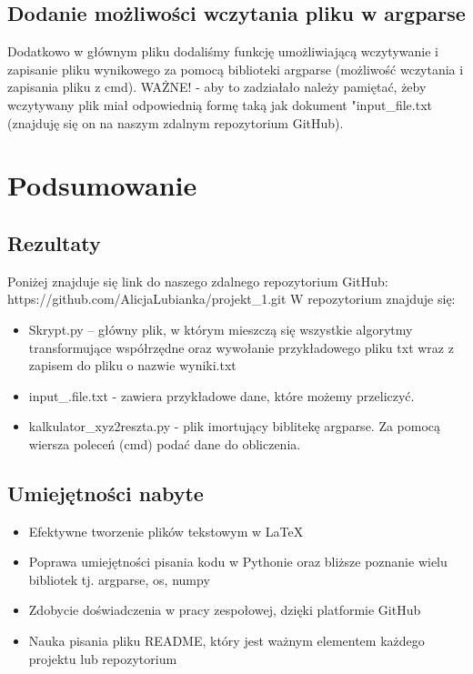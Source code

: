 \documentclass[10pt,a4paper]{article}
\begin{document}
	

	
	\subsection{Dodanie możliwości wczytania pliku w argparse}
	Dodatkowo w głównym pliku dodaliśmy funkcję umożliwiającą wczytywanie i zapisanie pliku wynikowego za pomocą biblioteki argparse (możliwość wczytania i zapisania pliku z cmd).  
	WAŻNE! - aby to zadziałało należy pamiętać, żeby wczytywany plik miał odpowiednią formę taką jak dokument "input\_{}file.txt (znajduję się on na naszym zdalnym repozytorium GitHub).
	
	\section{Podsumowanie}
	
	\subsection{Rezultaty}
		Poniżej znajduje się link do naszego zdalnego repozytorium GitHub:
	\newline
	https://github.com/AlicjaLubianka/projekt\_{}1.git
	\newline
	W repozytorium znajduje się:
	\begin{itemize}
	 \item Skrypt.py – główny plik, w którym mieszczą się wszystkie algorytmy transformujące współrzędne oraz wywołanie przykładowego pliku txt wraz z zapisem do pliku o nazwie wyniki.txt
	 \item input\_{}.file.txt - zawiera przykładowe dane, które możemy przeliczyć.
	 \item kalkulator\_{}xyz2reszta.py - plik imortujący biblitekę argparse. Za pomocą wiersza poleceń (cmd) podać dane do obliczenia.
	 
	\end{itemize}
	
	\subsection{Umiejętności nabyte}
	\begin{itemize}
	\item Efektywne tworzenie plików tekstowym w LaTeX 
	\item Poprawa umiejętności pisania kodu w Pythonie oraz bliższe poznanie wielu bibliotek tj. argparse, os, numpy
	\item Zdobycie doświadczenia w pracy zespołowej, dzięki platformie GitHub
	\item Nauka pisania pliku README, który jest ważnym elementem każdego projektu lub repozytorium
	\end{itemize}
	
\end{document}
